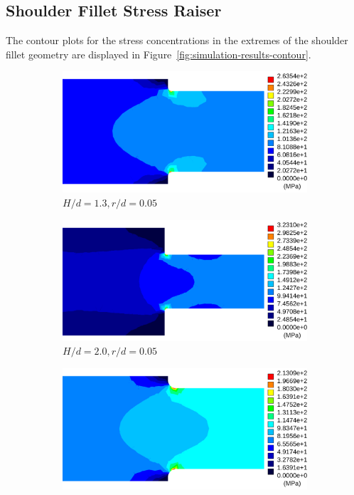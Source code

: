 \documentclass[a4paper,11pt,twocolumn]{article}
\begin{document}
\subsection{Shoulder Fillet Stress Raiser}

The contour plots for the stress concentrations in the extremes of the shoulder
fillet geometry are displayed in Figure~\vref{fig:simulation-results-contour}.

\begin{figure}[t]
    \centering
    \begin{subfigure}[b]{0.48\textwidth}
        \includegraphics[width=\textwidth]{img/Hd1-3_rd0-05.pdf}
        \caption{$H/d = 1.3,r/d = 0.05$}
        \label{fig:H/d=1.3-r/d=0.05}
    \end{subfigure}
    \begin{subfigure}[b]{0.48\textwidth}
        \includegraphics[width=\textwidth]{img/Hd2-0_rd0-05.pdf}
        \caption{$H/d = 2.0,r/d = 0.05$}
        \label{fig:H/d=2.0-r/d=0.05}
    \end{subfigure}
    \begin{subfigure}[b]{0.48\textwidth}
        \includegraphics[width=\textwidth]{img/Hd1-3_rd0-10.pdf}

\end{subfigure}
\end{figure}
\end{document}
